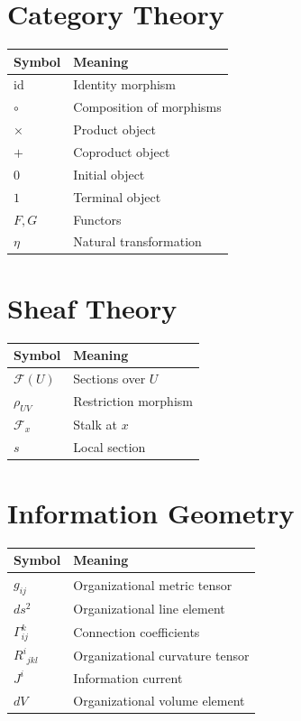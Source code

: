 \documentclass[11pt,oneside]{book}
\numberwithin{equation}{chapter}
\theoremstyle{definition}
\theoremstyle{plain}
\begin{document}
\section{Category Theory}

\begin{longtable}{ll}
\toprule
Symbol & Meaning\\
\midrule
$\mathrm{id}$ & Identity morphism\\
$\circ$ & Composition of morphisms\\
$\times$ & Product object\\
$+$ & Coproduct object\\
$0$ & Initial object\\
$1$ & Terminal object\\
$F,G$ & Functors\\
$\eta$ & Natural transformation\\
\bottomrule
\end{longtable}

\section{Sheaf Theory}

\begin{longtable}{ll}
\toprule
Symbol & Meaning\\
\midrule
$\mathcal F(U)$ & Sections over $U$\\
$\rho_{UV}$ & Restriction morphism\\
$\mathcal F_x$ & Stalk at $x$\\
$s$ & Local section\\
\bottomrule
\end{longtable}

\section{Information Geometry}

\begin{longtable}{ll}
\toprule
Symbol & Meaning\\
\midrule
$g_{ij}$ & Organizational metric tensor\\
$ds^2$ & Organizational line element\\
$\Gamma^k_{ij}$ & Connection coefficients\\
$R^i{}_{jkl}$ & Organizational curvature tensor\\
$J^i$ & Information current\\
$dV$ & Organizational volume element\\
\bottomrule
\end{longtable}
\end{document}
